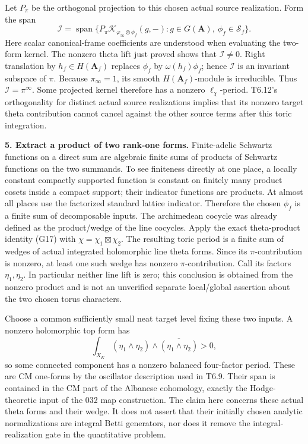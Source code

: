 \documentclass[11pt,a4paper]{article}
\theoremstyle{definition}
\begin{document}
Let \(P_\pi\) be the orthogonal projection to this chosen actual source realization. Form the span \[
\mathcal I=\operatorname{span}\{P_\pi\mathcal K_{\varphi_\infty\otimes\phi_f}(g,-):
                  g\in G(\mathbf A),\ \phi_f\in\mathcal S_f\}.
\] Here scalar canonical-frame coefficients are understood when evaluating the two-form kernel. The nonzero theta lift just proved shows that \(\mathcal I\ne0\). Right translation by \(h_f\in H(\mathbf A_f)\) replaces \(\phi_f\) by \(\omega(h_f)\phi_f\); hence \(\mathcal I\) is an invariant subspace of \(\pi\). Because \(\pi_\infty=1\), its smooth \(H(\mathbf A_f)\)-module is irreducible. Thus \(\mathcal I=\pi^\infty\). Some projected kernel therefore has a nonzero \(\ell_\chi\)-period. T6.12's orthogonality for distinct actual source realizations implies that its nonzero target theta contribution cannot cancel against the other source terms after this toric integration.

\textbf{5. Extract a product of two rank-one forms.} Finite-adelic Schwartz functions on a direct sum are algebraic finite sums of products of Schwartz functions on the two summands. To see finiteness directly at one place, a locally constant compactly supported function is constant on finitely many product cosets inside a compact support; their indicator functions are products. At almost all places use the factorized standard lattice indicator. Therefore the chosen \(\phi_f\) is a finite sum of decomposable inputs. The archimedean cocycle was already defined as the product/wedge of the line cocycles. Apply the exact theta-product identity (G17) with \(\chi=\chi_1\boxtimes\chi_2\). The resulting toric period is a finite sum of wedges of actual integrated holomorphic line theta forms. Since its \(\pi\)-contribution is nonzero, at least one such wedge has nonzero \(\pi\)-contribution. Call its factors \(\eta_1,\eta_2\). In particular neither line lift is zero; this conclusion is obtained from the nonzero product and is not an unverified separate local/global assertion about the two chosen torus characters.

Choose a common sufficiently small neat target level fixing these two inputs. A nonzero holomorphic top form has \[
\int_{X_K}(\eta_1\wedge\eta_2)\wedge
                  \overline{(\eta_1\wedge\eta_2)}>0,
\] so some connected component has a nonzero balanced four-factor period. These are CM one-forms by the oscillator description used in T6.9. Their span is contained in the CM part of the Albanese cohomology, exactly the Hodge-theoretic input of the 032 map construction. The claim here concerns these actual theta forms and their wedge. It does not assert that their initially chosen analytic normalizations are integral Betti generators, nor does it remove the integral-realization gate in the quantitative problem.
\end{document}
